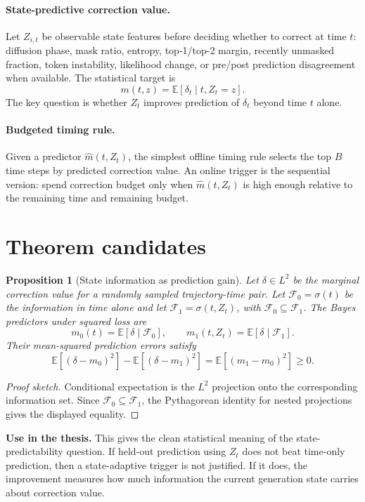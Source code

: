 \documentclass[11pt]{article}
\newcommand{\E}{\mathbb E}
\newtheorem{proposition}{Proposition}
\begin{document}
\paragraph{State-predictive correction value.}
Let \(Z_{i,t}\) be observable state features before deciding whether to
correct at time \(t\): diffusion phase, mask ratio, entropy, top-1/top-2
margin, recently unmasked fraction, token instability, likelihood change, or
pre/post prediction disagreement when available.  The statistical target is
\[
m(t,z)=\E[\delta_t \mid t, Z_t=z].
\]
The key question is whether \(Z_t\) improves prediction of \(\delta_t\) beyond
time \(t\) alone.

\paragraph{Budgeted timing rule.}
Given a predictor \(\widehat m(t,Z_t)\), the simplest offline timing rule
selects the top \(B\) time steps by predicted correction value.  An online
trigger is the sequential version: spend correction budget only when
\(\widehat m(t,Z_t)\) is high enough relative to the remaining time and
remaining budget.

\section*{Theorem candidates}

\begin{proposition}[State information as prediction gain]
Let \(\delta\in L^2\) be the marginal correction value for a randomly sampled
trajectory-time pair.  Let \(\mathcal F_0=\sigma(t)\) be the information in
time alone and let \(\mathcal F_1=\sigma(t,Z_t)\), with
\(\mathcal F_0\subseteq\mathcal F_1\).  The Bayes predictors under squared loss
are
\[
m_0(t)=\E[\delta\mid\mathcal F_0],
\qquad
m_1(t,Z_t)=\E[\delta\mid\mathcal F_1].
\]
Their mean-squared prediction errors satisfy
\[
\E[(\delta-m_0)^2]-\E[(\delta-m_1)^2]
= \E[(m_1-m_0)^2]\ge 0.
\]
\end{proposition}

\begin{proof}[Proof sketch]
Conditional expectation is the \(L^2\) projection onto the corresponding
information set.  Since \(\mathcal F_0\subseteq\mathcal F_1\), the
Pythagorean identity for nested projections gives the displayed equality.
\end{proof}

\noindent
\textbf{Use in the thesis.}  This gives the clean statistical meaning of the
state-predictability question.  If held-out prediction using \(Z_t\) does not
beat time-only prediction, then a state-adaptive trigger is not justified.  If
it does, the improvement measures how much information the current generation
state carries about correction value.
\end{document}
